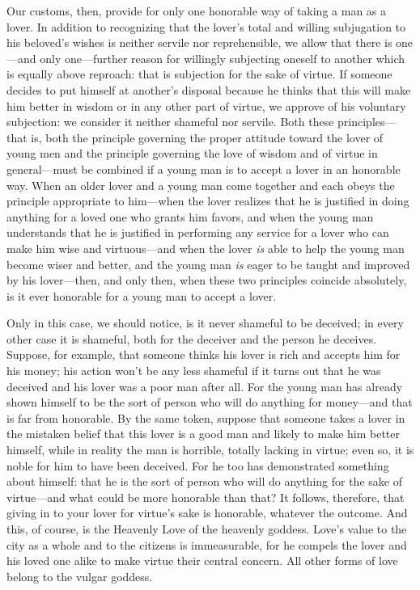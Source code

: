 Our customs, then, provide for only one honorable way of taking a man
 as a lover. In addition to recognizing that the lover’s total
and willing subjugation to his beloved’s wishes is neither servile nor
reprehensible, we allow that there is one---and only one---further
reason for willingly subjecting oneself to another which is equally
above reproach: that is subjection for the sake of virtue. If someone
decides to put himself at another’s disposal because he thinks that this
will make him better in wisdom or in any other part of virtue, we
approve of his voluntary subjection: we consider it neither shameful nor
servile. Both these principles---that is, both the principle governing
the proper attitude toward the lover of young men and the principle
governing the love of wisdom and of  virtue in general---must be
combined if a young man is to accept a lover in an honorable way. When
an older lover and a young man come together and each obeys the
principle appropriate to him---when the lover realizes that he is
justified in doing anything for a loved one who grants him favors, and
when the young man understands that he is justified in performing any
service for a lover who can make him wise and virtuous---and when the
 lover {\em is} able to help the young man become wiser and
better, and the young man {\em is} eager to be taught and improved by
his lover---then, and only then, when these two principles coincide
absolutely, is it ever honorable for a young man to accept a lover.

Only in this case, we should notice, is it never shameful to be
deceived; in every other case it is shameful, both for the deceiver and
the person he  deceives. Suppose, for example, that
someone thinks his lover is rich and accepts him for his money; his
action won’t be any less shameful if it turns out that he was deceived
and his lover was a poor man after all. For the young man has already
shown himself to be the sort of person who will do anything for
money---and that is far from honorable. By the same token, suppose that
someone takes a lover in the mistaken belief that this lover is a good
man and likely to make him better himself, while in reality the man is
horrible, totally lacking in virtue; even so, it is noble for him to
 have been deceived. For he too has demonstrated something about
himself: that he is the sort of person who will do anything for the sake
of virtue---and what could be more honorable than that? It follows,
therefore, that giving in to your lover for virtue’s sake is honorable,
whatever the outcome. And this, of course, is the Heavenly Love of the
heavenly goddess. Love’s value to the city as a whole and to the
citizens is immeasurable, for he compels the lover and his loved one
alike to make virtue their central  concern. All other forms of
love belong to the vulgar goddess.

